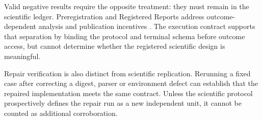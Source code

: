 Valid negative results require the opposite treatment: they must remain in the
scientific ledger. Preregistration and Registered Reports address outcome-dependent
analysis and publication incentives \citep{nosek2018preregistration,chambers2015registered}.
The execution contract supports that separation by binding the protocol and
terminal schema before outcome access, but cannot determine whether the registered
scientific design is meaningful.

Repair verification is also distinct from scientific replication. Rerunning a
fixed case after correcting a digest, parser or environment defect can establish
that the repaired implementation meets the same contract. Unless the scientific
protocol prospectively defines the repair run as a new independent unit, it cannot
be counted as additional corroboration.

